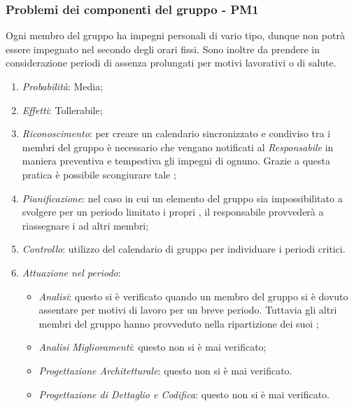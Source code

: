 \subsubsection{Problemi dei componenti del gruppo - PM1}
Ogni membro del gruppo ha impegni personali di vario tipo, dunque non potr\`a essere impegnato nel  secondo degli orari fissi. Sono inoltre da prendere in considerazione periodi di assenza prolungati per motivi lavorativi o di salute.
\begin{enumerate}
\item \textit{Probabilit\`a}: Media;
\item \textit{Effetti}: Tollerabile;
\item \textit{Riconoscimento}: per creare un calendario sincronizzato e condiviso tra i membri del gruppo è necessario che vengano notificati al \textit{Responsabile} in maniera preventiva e tempestiva gli impegni di ognuno. Grazie a questa pratica è possibile scongiurare tale ;
\item \textit{Pianificazione}: nel caso in cui un elemento del gruppo sia impossibilitato a svolgere per un periodo limitato i propri , il responsabile provveder\`a a riassegnare i  ad altri membri;
\item \textit{Controllo}: utilizzo del calendario di gruppo per individuare i periodi critici.
\item \textit{Attuazione nel periodo}: 
	\begin{itemize}
	\item \textit{Analisi}: questo  si è verificato quando un membro del gruppo si è dovuto assentare per motivi di lavoro per un breve periodo. Tuttavia gli altri membri del gruppo hanno provveduto nella ripartizione dei suoi ;
	\item \textit{Analisi Miglioramenti}: questo  non si è mai verificato;
	\item \textit{Progettazione Architetturale}: questo  non si è mai verificato.
	\item \textit{Progettazione di Dettaglio e Codifica}: questo  non si è mai verificato.
	\end{itemize}
\end{enumerate}


